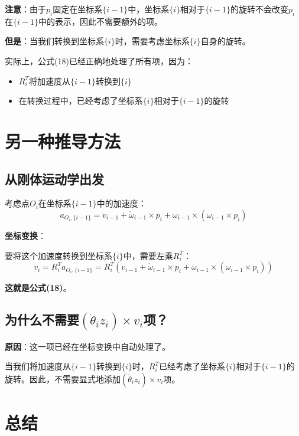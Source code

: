 \documentclass[12pt,a4paper]{article}
\begin{document}
\textbf{注意}：由于$p_i$固定在坐标系$\{i-1\}$中，坐标系$\{i\}$相对于$\{i-1\}$的旋转不会改变$p_i$在$\{i-1\}$中的表示，因此不需要额外的项。

\textbf{但是}：当我们转换到坐标系$\{i\}$时，需要考虑坐标系$\{i\}$自身的旋转。

实际上，公式(18)已经正确地处理了所有项，因为：
\begin{itemize}
\item $R_i^T$将加速度从$\{i-1\}$转换到$\{i\}$
\item 在转换过程中，已经考虑了坐标系$\{i\}$相对于$\{i-1\}$的旋转
\end{itemize}

\section{另一种推导方法}

\subsection{从刚体运动学出发}

考虑点$O_i$在坐标系$\{i-1\}$中的加速度：
\begin{equation}
a_{O_i, \{i-1\}} = \dot{v}_{i-1} + \dot{\omega}_{i-1} \times p_i + \omega_{i-1} \times (\omega_{i-1} \times p_i)
\end{equation}

\textbf{坐标变换}：

要将这个加速度转换到坐标系$\{i\}$中，需要左乘$R_i^T$：
\begin{equation}
\dot{v}_i = R_i^T a_{O_i, \{i-1\}} = R_i^T (\dot{v}_{i-1} + \dot{\omega}_{i-1} \times p_i + \omega_{i-1} \times (\omega_{i-1} \times p_i))
\end{equation}

\textbf{这就是公式(18)}。

\subsection{为什么不需要$(\dot{\theta}_i z_i) \times v_i$项？}

\textbf{原因}：这一项已经在坐标变换中自动处理了。

当我们将加速度从$\{i-1\}$转换到$\{i\}$时，$R_i^T$已经考虑了坐标系$\{i\}$相对于$\{i-1\}$的旋转。因此，不需要显式地添加$(\dot{\theta}_i z_i) \times v_i$项。

\section{总结}
\end{document}
